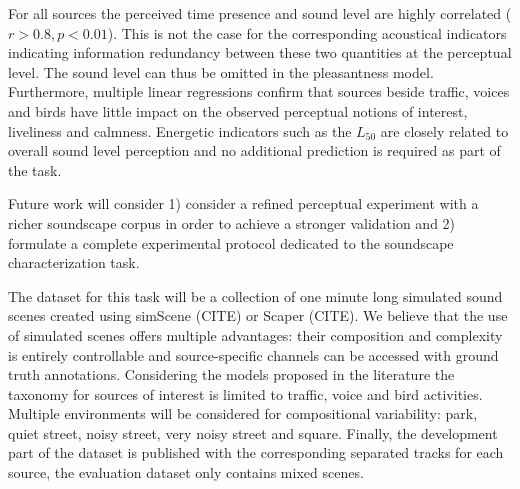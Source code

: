 \documentclass{article}
\begin{document}
\begin{sloppy}
For all sources the perceived time presence and sound level are highly correlated ($r>0.8, p<0.01$). This is not the case for the corresponding acoustical indicators indicating information redundancy between these two quantities at the perceptual level. The sound level can thus be omitted in the pleasantness model. Furthermore, multiple linear regressions confirm that sources beside traffic, voices and birds have little impact on the observed perceptual notions of interest, liveliness and calmness. Energetic indicators such as the $L_{50}$ are closely related to overall sound level perception and no additional prediction is required as part of the task.

Future work will consider 1) consider a refined perceptual experiment with a richer soundscape corpus in order to achieve a stronger validation and 2) formulate a complete  experimental protocol dedicated to the soundscape characterization task.

The dataset for this task will be a collection of one minute long simulated sound scenes created using simScene (CITE) or Scaper (CITE). We believe that the use of simulated scenes offers multiple advantages: their composition and complexity is entirely controllable and source-specific channels can be accessed with ground truth annotations. Considering the models proposed in the literature the taxonomy for sources of interest is limited to traffic, voice and bird activities. Multiple environments will be considered for compositional variability: park, quiet street, noisy street, very noisy street and square. Finally, the development part of the dataset is published with the corresponding separated tracks for each source, the evaluation dataset only contains mixed scenes.







\end{sloppy}
\end{document}
